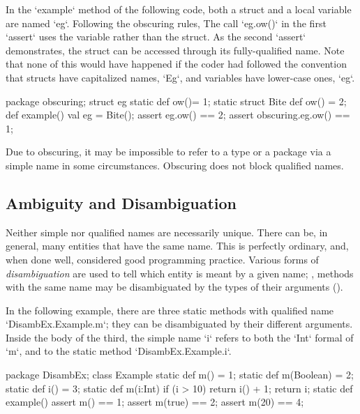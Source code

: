 \begin{ex}
In the \xcd`example` method of the following code, both a struct and a local
variable are named \xcd`eg`.  Following the obscuring rules, The call
\xcd`eg.ow()` in the first \xcd`assert` uses the variable rather than the struct.  
As the second \xcd`assert` demonstrates, the struct can be accessed through
its fully-qualified name.   Note that none of this would have happened if the
coder had followed the convention that structs have capitalized names,
\xcd`Eg`, and variables have lower-case ones, \xcd`eg`. 

\begin{xten}
package obscuring;
struct eg {
   static def ow()= 1;
   static struct Bite {
      def ow() = 2;
   }
   def example() {
       val eg = Bite();
       assert eg.ow() == 2;
       assert obscuring.eg.ow() == 1;
     }
}

\end{xten}

\end{ex}

Due to obscuring, it may be impossible to refer to a type or a package via a
simple name in some circumstances.  Obscuring does not block qualified names.



\subsection{Ambiguity and Disambiguation}

Neither simple nor qualified names are necessarily unique.  There can be, in
general, many entities that have the same name.  This is perfectly ordinary,
and, when done well, considered good programming practice.   Various forms of
{\em disambiguation} are used to tell which entity is meant by a given name;
\eg, methods with the same name may be disambiguated by the types of their
arguments ().

\begin{ex}
In the following example, there are three static methods with 
qualified name \xcd`DisambEx.Example.m`; they can be disambiguated by their
different arguments.   Inside the body of the third, the simple name \xcd`i`
refers to both the \xcd`Int` formal of \xcd`m`, and to the static method 
\xcd`DisambEx.Example.i`.  
\begin{xten}
package DisambEx; 
class Example {
  static def m() = 1;
  static def m(Boolean) = 2;
  static def i() = 3;
  static def m(i:Int) {
    if (i > 10) {
      return i() + 1;
    }
    return i;
  }
  static def example() {
    assert m() == 1;
    assert m(true) == 2;
    assert m(20) == 4;
  }
}
\end{xten}
\end{ex}



